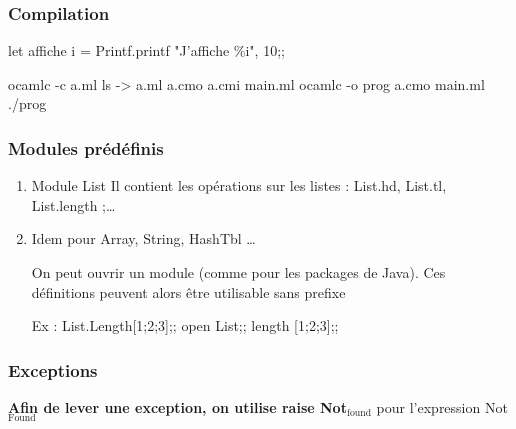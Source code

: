 \documentclass[11pt]{article}
\begin{document}
\subsubsection{Compilation}
\label{sec-1-4-6}

let affiche i = Printf.printf "J'affiche \%i", 10;;


ocamlc -c a.ml
ls -> a.ml a.cmo a.cmi main.ml
ocamlc -o prog a.cmo main.ml
./prog

\subsubsection{Modules prédéfinis}
\label{sec-1-4-7}
\begin{enumerate}
\item Module List
\label{sec-1-4-7-1}
Il contient les opérations sur les listes : List.hd, List.tl,
List.length ;\ldots{}
\item Idem pour Array, String, HashTbl \ldots{}
\label{sec-1-4-7-2}

On peut ouvrir un module (comme pour les packages de Java). Ces
définitions peuvent alors être utilisable sans prefixe


Ex :
List.Length[1;2;3];;
open List;;
length [1;2;3];;
\end{enumerate}


\subsubsection{Exceptions}
\label{sec-1-4-8}
\textbf{Afin de lever une exception, on utilise raise Not$_{\text{found}}$} pour
 l'expression Not$_{\text{Found}}$
\end{document}
